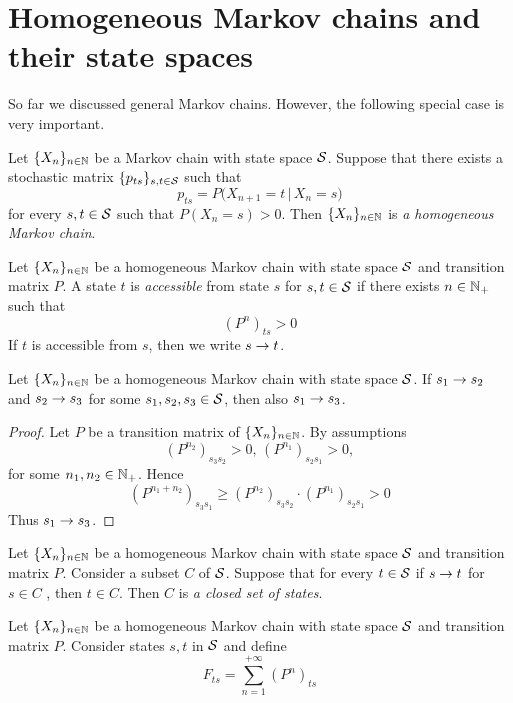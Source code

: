 \section{Homogeneous Markov chains and their state spaces}
\noindent
So far we discussed general Markov chains. However, the following special case is very important.

\begin{definition}
Let $\{X_n\}_{n\in {\mathbb N}}$ be a Markov chain with state space ${\mathcal S}$. Suppose that there exists a stochastic matrix $\{p_{ts}\}_{s,t\in {\mathcal S}}$ such that
$$p_{ts} = P\big(X_{n+1} = t\,\big|\,X_n = s\big)$$
for every $s,t\in {\mathcal S}$ such that $P(X_n = s)>0$. Then $\{X_n\}_{n\in {\mathbb N}}$ is \textit{a homogeneous Markov chain}.
\end{definition}

\begin{definition}
Let $\{X_n\}_{n\in {\mathbb N}}$ be a homogeneous Markov chain with state space ${\mathcal S}$ and transition matrix $P$. A state $t$ is \textit{accessible} from state $s$ for $s,t\in {\mathcal S}$ if there exists $n \in {\mathbb N}_+$ such that 
$$\left(P^n\right)_{ts} > 0$$
If $t$ is accessible from $s$, then we write $s\rightarrow t$.
\end{definition}

\begin{fact}\label{fact:accessibility_is_transitive}
Let $\{X_n\}_{n\in {\mathbb N}}$ be a homogeneous Markov chain with state space ${\mathcal S}$. If $s_1\rightarrow s_2$ and $s_2\rightarrow s_3$ for some $s_1,s_2,s_3\in {\mathcal S}$, then also $s_1\rightarrow s_3$.
\end{fact}
\begin{proof}
Let $P$ be a transition matrix of $\{X_n\}_{n\in {\mathbb N}}$. By assumptions
$$\left(P^{n_2}\right)_{s_3s_2}>0,\,\left(P^{n_1}\right)_{s_2s_1}>0,
$$
for some $n_1,n_2\in {\mathbb N}_+$. Hence
$$\left(P^{n_1+n_2}\right)_{s_3s_1} \geq \left(P^{n_2}\right)_{s_3s_2}\cdot \left(P^{n_1}\right)_{s_2s_1} > 0$$
Thus $s_1\rightarrow s_3$.
\end{proof}

\begin{definition}
Let $\{X_n\}_{n\in {\mathbb N}}$ be a homogeneous Markov chain with state space ${\mathcal S}$ and transition matrix $P$. Consider a subset $C$ of ${\mathcal S}$. Suppose that for every $t\in {\mathcal S}$ if $s\rightarrow t$ for $s\in C$ , then $t\in C$. Then $C$ is \textit{a closed set of states}.
\end{definition}

\noindent
Let $\{X_n\}_{n\in {\mathbb N}}$ be a homogeneous Markov chain with state space ${\mathcal S}$ and transition matrix $P$. Consider states $s,t$ in ${\mathcal S}$ and define
$$F_{ts} = \sum_{n=1}^{+\infty}\left(P^n\right)_{ts}$$

